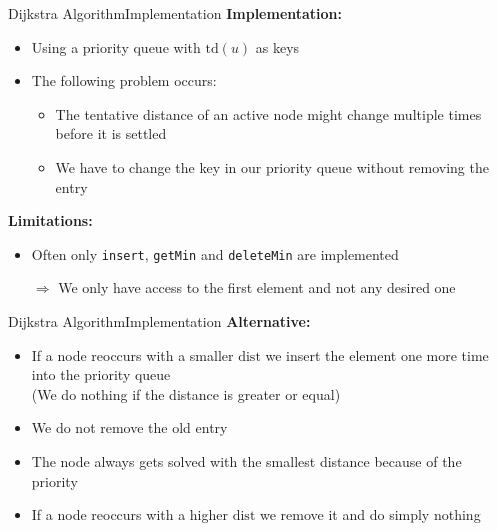 
\begin{frame}{Dijkstra Algorithm}{Implementation}
  \textbf{Implementation:}
  \begin{itemize}
    \item
      Using a {\color{Mittel-Blau}priority queue} with
      {\color{Mittel-Blau}$\mathrm{td}(u)$} as keys
    \item
      The following problem occurs:
      \begin{itemize}
        \item
          The {\color{Mittel-Blau}tentative distance} of an active node might
          change multiple times before it is settled
        \item
          We have to change the key in our {\color{Mittel-Blau}priority queue}
          without removing the entry
      \end{itemize}
  \end{itemize}
  \vspace{1em}
  \textbf{Limitations:}
  \begin{itemize}
    \item
    Often only \texttt{insert}, \texttt{getMin} and \texttt{deleteMin}
    are implemented
    \item[$\Rightarrow$]
    We only have access to the first element and not any desired one
  \end{itemize}
\end{frame}


\begin{frame}{Dijkstra Algorithm}{Implementation}
  \textbf{Alternative:}
  \begin{itemize}
    \item
      If a node reoccurs with a smaller {\color{Mittel-Blau}$\mathrm{dist}$}
      we insert the element one more time into the
      {\color{Mittel-Blau}priority queue}\\
      {\color{gray}(We do nothing if the distance is greater or equal)}
    \item
      We do not remove the old entry
    \item
      The node always gets solved with the smallest distance because of the
      priority
    \item
      If a node reoccurs with a higher {\color{Mittel-Blau}$\mathrm{dist}$}
      we remove it and do simply {\color{Mittel-Blau}nothing}
  \end{itemize}
\end{frame}

